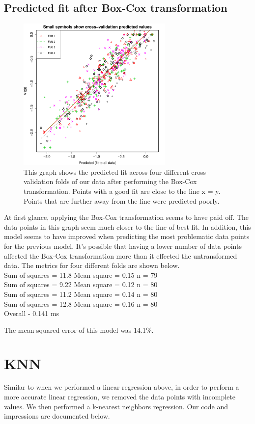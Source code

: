 \documentclass{article}
\begin{document}
\subsection{Predicted fit after Box-Cox transformation}
\begin{figure}[H]
\centering
\includegraphics[width=3.0in]{part1b.pdf}
\caption{This graph shows the predicted fit across four different cross-validation folds of our data after performing the Box-Cox transformation. Points with a good fit are close to the line x = y. Points that are further away from the line were predicted poorly.}\label{fig_container} 
\end{figure}

At first glance, applying the Box-Cox transformation seems to have paid off. The data points in this graph seem much closer to the line of best fit. In addition, this model seems to have improved when predicting the most problematic data points for the previous model. It's possible that having a lower number of data points affected the Box-Cox transformation more than it effected the untransformed data. The metrics for four different folds are shown below.\\ 

Sum of squares = 11.8    Mean square = 0.15    n = 79\\
Sum of squares = 9.22    Mean square = 0.12    n = 80\\ 
Sum of squares = 11.2    Mean square = 0.14    n = 80\\ 
Sum of squares = 12.8    Mean square = 0.16    n = 80\\ 

Overall - 0.141 ms

The mean squared error of this model was 14.1\%. 

\section{KNN}
Similar to when we performed a linear regression above, in order to perform a more accurate 
linear regression, we removed the data points with incomplete values. We then performed a k-nearest neighbors regression. Our code and impressions are documented below.
\end{document}
